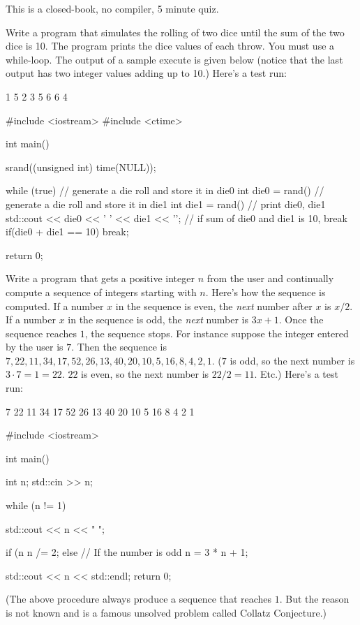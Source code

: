 

This is a closed-book, no compiler, 5 minute quiz.

\nextq
Write a program that simulates the rolling of two dice until
the sum of the two dice is 10.
The program prints the dice values of each throw.
You must use a while-loop.
The output of a sample execute is given below (notice that the
last output has two integer values adding up to 10.)
Here's a test run:
\begin{console}[fontsize=\small]
1 5
2 3
5 6
6 4
\end{console}
\ANSWER
\begin{answercode}
#include <iostream>
#include <ctime>

int main()
{
    srand((unsigned int) time(NULL));
    
    while (true)
    {
        // generate a die roll and store it in die0
        int die0 = rand() %
        // generate a die roll and store it in die1
        int die1 = rand() %
        // print die0, die1
        std::cout << die0 << ' ' << die1 << '\n';
        // if sum of die0 and die1 is 10, break
        if(die0 + die1 == 10)
        {
             break;
        }
    }

    return 0;
}
\end{answercode}

\nextq
Write a program that gets a positive integer $n$ from the user
and continually compute a sequence of integers starting with $n$.
Here's how the sequence is computed.
If a number $x$ in the sequence is even, the \textit{next} number
after $x$ is $x / 2$.
If a number $x$ in the sequence is odd, the \textit{next} number
is $3x + 1$.
Once the sequence reaches $1$, the sequence stops.
For instance suppose the integer entered by the user is $7$.
Then the sequence is $7, 22, 11, 34, 17, 52, 26, 13, 40, 20, 10, 5,
16, 8, 4, 2, 1$.
($7$ is odd, so the next number is $3 \cdot 7 = 1 = 22$.
$22$ is even, so the next number is $22/2 = 11$.
Etc.)
Here's a test run:
\begin{console}[fontsize=\footnotesize,commandchars=\\\{\}]
7 22 11 34 17 52 26 13 40 20 10 5 16 8 4 2 1
\end{console}
\ANSWER
\begin{answercode}
#include <iostream>

int main()
{
    int n;
    std::cin >> n;

    while (n != 1) 
    {
        std::cout << n << " "; 

        if (n %
        {
            n /= 2;
        }
        else // If the number is odd
        {
            n = 3 * n + 1;
        }
    }

    std::cout << n << std::endl;
    return 0;
}
\end{answercode}
(The above procedure always produce a sequence that reaches $1$.
But the reason is not known and is a famous unsolved problem called
Collatz Conjecture.)


